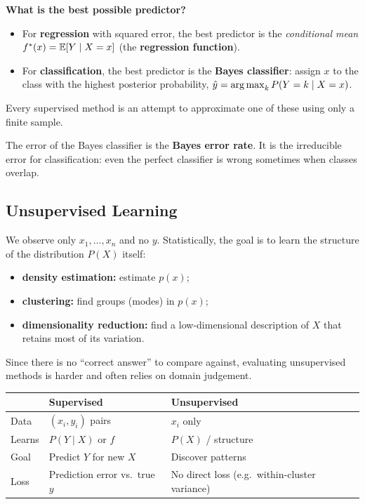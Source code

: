 \begin{keyidea}
\textbf{What is the best possible predictor?}
\begin{itemize}
  \item For \textbf{regression} with squared error, the best predictor is the \emph{conditional mean} $f^*(x)=\mathbb{E}[Y\mid X=x]$ (the \textbf{regression function}).
  \item For \textbf{classification}, the best predictor is the \textbf{Bayes classifier}: assign $x$ to the class with the highest posterior probability, $\hat y=\operatorname*{arg\,max}_k P(Y=k\mid X=x)$.
\end{itemize}
Every supervised method is an attempt to approximate one of these using only a finite sample.
\end{keyidea}

The error of the Bayes classifier is the \textbf{Bayes error rate}. It is the irreducible error for classification: even the perfect classifier is wrong sometimes when classes overlap.

\subsection{Unsupervised Learning}

We observe only $x_1,\dots,x_n$ and no $y$. Statistically, the goal is to learn the structure of the distribution $P(X)$ itself:
\begin{itemize}
  \item \textbf{density estimation:} estimate $p(x)$;
  \item \textbf{clustering:} find groups (modes) in $p(x)$;
  \item \textbf{dimensionality reduction:} find a low-dimensional description of $X$ that retains most of its variation.
\end{itemize}
Since there is no ``correct answer'' to compare against, evaluating unsupervised methods is harder and often relies on domain judgement.

\begin{center}
\begin{tabular}{@{}p{3.5cm}p{5.1cm}p{5.1cm}@{}}
\toprule
 & \textbf{Supervised} & \textbf{Unsupervised}\\
\midrule
Data & $(x_i,y_i)$ pairs & $x_i$ only\\
Learns & $P(Y\mid X)$ or $f$ & $P(X)$ / structure\\
Goal & Predict $Y$ for new $X$ & Discover patterns\\
Loss & Prediction error vs.\ true $y$ & No direct loss (e.g.\ within-cluster variance)\\
\bottomrule
\end{tabular}
\end{center}

